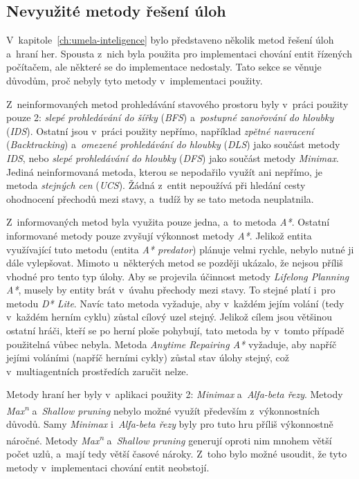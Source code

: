 \subsection{Nevyužité metody řešení úloh}

V~kapitole~\ref{ch:umela-inteligence} bylo představeno několik metod řešení úloh a~hraní her. Spousta z~nich byla použita pro implementaci chování entit řízených počítačem, ale některé se do implementace nedostaly. Tato sekce se věnuje důvodům, proč nebyly tyto metody v~implementaci použity.

Z~neinformovaných metod prohledávání stavového prostoru byly v~práci použity pouze 2: \emph{slepé prohledávání do šířky} (\emph{BFS}) a~\emph{postupné zanořování do hloubky} (\emph{IDS}). Ostatní jsou v~práci použity nepřímo, například \emph{zpětné navracení} (\emph{Backtracking}) a~\emph{omezené prohledávání do hloubky} (\emph{DLS}) jako součást metody \emph{IDS}, nebo \emph{slepé prohledávání do hloubky} (\emph{DFS}) jako součást metody \emph{Minimax}. Jediná neinformovaná metoda, kterou se nepodařilo využít ani nepřímo, je metoda \emph{stejných cen} (\emph{UCS}). Žádná z~entit nepoužívá při hledání cesty ohodnocení přechodů mezi stavy, a~tudíž by se tato metoda neuplatnila.

Z~informovaných metod byla využita pouze jedna, a~to metoda \emph{A*}. Ostatní informované metody pouze zvyšují výkonnost metody \emph{A*}. Jelikož entita využívající tuto metodu (entita \emph{A* predator}) plánuje velmi rychle, nebylo nutné ji dále vylepšovat. Mimoto u~některých metod se později ukázalo, že nejsou příliš vhodné pro tento typ úlohy. Aby se projevila účinnost metody \emph{Lifelong Planning A*}, musely by entity brát v~úvahu přechody mezi stavy. To stejné platí i~pro metodu \emph{D* Lite}. Navíc tato metoda vyžaduje, aby v~každém jejím volání (tedy v~každém herním cyklu) zůstal cílový uzel stejný. Jelikož cílem jsou většinou ostatní hráči, kteří se po herní ploše pohybují, tato metoda by v~tomto případě použitelná vůbec nebyla. Metoda \emph{Anytime Repairing A*} vyžaduje, aby napříč jejími voláními (napříč herními cykly) zůstal stav úlohy stejný, což v~multiagentních prostředích zaručit nelze.

Metody hraní her byly v~aplikaci použity 2: \emph{Minimax} a~\emph{Alfa-beta řezy}. Metody \emph{Max\textsuperscript{n}} a~\emph{Shallow pruning} nebylo možné využít především z~výkonnostních důvodů. Samy \emph{Minimax} i~\emph{Alfa-beta řezy} byly pro tuto hru příliš výkonnostně náročné. Metody \emph{Max\textsuperscript{n}} a~\emph{Shallow pruning} generují oproti nim mnohem větší počet uzlů, a~mají tedy větší časové nároky. Z~toho bylo možné usoudit, že tyto metody v~implementaci chování entit neobstojí.


